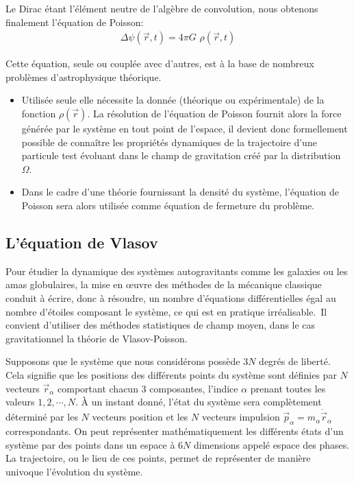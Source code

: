 Le Dirac étant l'élément neutre de l'algèbre de convolution, nous obtenons finalement l'équation de Poisson:
\begin{align*}
	\Delta\psi(\vec{r},t)=4\pi G\,\,\rho(\vec{r},t)
\end{align*}

Cette équation, seule ou couplée avec d'autres, est à la base de nombreux problèmes d'astrophysique théorique.

\begin{itemize}

	\item Utilisée seule elle nécessite la donnée (théorique ou expérimentale) de la fonction $\rho(\vec{r})$. La résolution de l'équation de
		Poisson fournit alors la force générée par le système en tout point de l'espace, il devient donc formellement possible de
		connaître les propriétés dynamiques de la trajectoire d'une particule test évoluant dans le champ de gravitation créé par la
		distribution $\Omega$.

	\item Dans le cadre d'une théorie fournissant la densité du système, l'équation de Poisson sera alors utilisée comme équation de fermeture
		du problème.

\end{itemize}

\subsection{L'équation de Vlasov}

Pour étudier la dynamique des systèmes autogravitants comme les galaxies ou les amas globulaires, la mise en œuvre des méthodes de la mécanique
classique conduit à écrire, donc à résoudre, un nombre d'équations différentielles égal au nombre d'étoiles composant le système, ce qui est en
pratique irréalisable.\ Il convient d'utiliser des méthodes statistiques de champ moyen, dans le cas gravitationnel la théorie de Vlasov-Poisson.

Supposons que le système que nous considérons possède $3N$ degrés de liberté. Cela signifie que les positions des différents points du système sont
définies par $N$ vecteurs $\vec{r}_{\alpha}$ comportant chacun 3 composantes, l'indice $\alpha$ prenant toutes les valeurs $1,2,\cdots,N$. À un
instant donné, l'état du système sera complètement déterminé par les $N$ vecteurs position et les $N$ vecteurs impulsion
$\vec{p}_{\alpha}=m_{\alpha}\dot{\vec{r}}_{\alpha}$ correspondants. On peut représenter mathématiquement les différents états d'un système par
des points dans un espace à $6N$ {dimension}s appelé espace des phases. La trajectoire, ou le lieu de ces points, permet de représenter de manière
univoque l'évolution du système.

